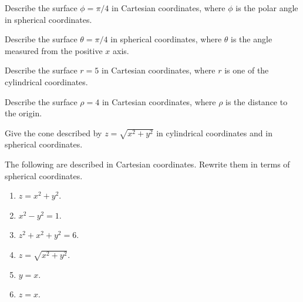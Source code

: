 \begin{ex} Describe the surface $\phi =\pi
/4$ in Cartesian coordinates, where $\phi $ is the polar angle in spherical coordinates.
\end{ex}

\begin{ex} Describe the surface $\theta =\pi /4$ in spherical coordinates, where $\theta $ is
the angle measured from the positive $x$ axis. 
\end{ex}

\begin{ex} Describe the surface $r=5$ in Cartesian coordinates, where 
$r$ is one of the cylindrical coordinates.
\end{ex}

\begin{ex} Describe the surface $\rho =4$ in Cartesian coordinates, 
where $\rho $ is the distance to the origin.
\end{ex}

\begin{ex} Give the cone described by $z=\sqrt{x^{2}+y^{2}}$ in cylindrical coordinates and
in spherical coordinates.
\end{ex}

\begin{ex} The following are described in Cartesian coordinates. Rewrite them in terms of spherical coordinates.

\begin{enumerate}
\item $z=x^{2}+y^{2}$.

\item $x^{2}-y^{2}=1$.

\item $z^{2}+x^{2}+y^{2}=6$.

\item $z=\sqrt{x^{2}+y^{2}}$.

\item $y=x$.

\item $z=x$.
\end{enumerate}
\end{ex}

